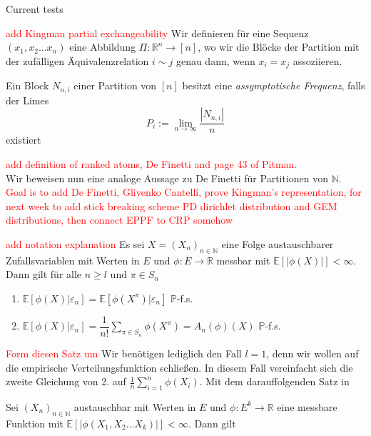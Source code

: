 \begin{section}{Current tests}
    
\textcolor{red}{add Kingman partial exchangeability}   
Wir definieren für eine Sequenz $(x_1,x_2...x_n)$ eine Abbildung $\Pi: \mathbb{R}^n \to [n]$, wo wir die Blöcke der Partition mit der zufälligen Äquivalenzrelation $i \sim j$ genau dann, wenn $x_i = x_j$ assoziieren.
\begin{Definition}
    Ein Block $N_{n,i}$ einer Partition von $[n]$ besitzt eine \textit{assymptotische Frequenz}, falls der Limes 
    \[
    P_i := \lim_{n \to \infty}\frac{|N_{n,i}|}{n}
    \] 
    existiert
\end{Definition}
\textcolor{red}{add definition of ranked atoms,  De Finetti and page 43 of Pitman.}
\\
Wir beweisen nun eine analoge Aussage zu De Finetti für Partitionen von $\mathbb{N}$.
\textcolor{red}{Goal is to add De Finetti, Glivenko Cantelli, prove Kingman's representation, for next week to add stick breaking scheme PD dirichlet distribution and GEM distributions, then connect EPPF to CRP somehow}
\begin{lemma}
    \cite[Lemma 8.11]{NeiningerHS}
    \label{exchangeable expectations}
    \textcolor{red}{add notation explanation}
    Es sei $X = (X_{n})_{n \in \mathbb{N}}$ eine Folge austauschbarer Zufallsvariablen mit Werten in $E$ und $\phi: E \to \mathbb{R}$ messbar mit $\mathbb{E}[|\phi(X)|]< \infty$. Dann gilt für alle $n \geq l$ und $\pi \in S_n$
    \begin{enumerate}
        \item $ \mathbb{E}[\phi(X)|\varepsilon_n] =\mathbb{E}[\phi(X^\pi)|\varepsilon_n]  $  $\mathbb{P}$-f.s.
        \item $ \mathbb{E}[\phi(X)|\varepsilon_n] = \dfrac{1}{n!}\sum_{\pi \in S_n} \phi(X^\pi) = A_n(\phi)(X)$ $\mathbb{P}$-f.s.
    \end{enumerate}
\end{lemma}
\textcolor{red}{Form diesen Satz um} Wir benötigen lediglich den Fall $l = 1$, denn wir wollen auf die empirische Verteilungsfunktion schließen. In diesem Fall vereinfacht sich die zweite Gleichung von 2. auf $\frac{1}{n}\sum_{i=1}^{n}\phi(X_i)$. Mit dem darauffolgenden Satz in \cite{NeiningerHS}
\begin{theorem}
\label{exchangeable law of large numbers}
\cite[Satz 8.12]{NeiningerHS}
Sei $(X_n)_{n \in \mathbb{N}}$ austauschbar mit Werten in $E$ und $\phi: E^k \to \mathbb{R}$ eine messbare Funktion mit $\mathbb{E}[|\phi(X_1,X_2 ... X_k)|] < \infty$. Dann gilt

\end{theorem}
\end{section}

